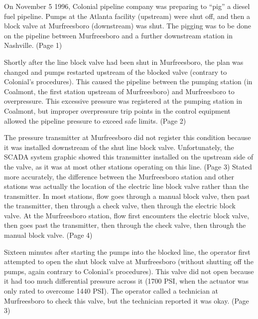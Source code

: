 







On November 5 1996, Colonial pipeline company was preparing to ``pig'' a diesel fuel pipeline.  Pumps at the Atlanta facility (upstream) were shut off, and then a block valve at Murfreesboro (downstream) was shut.  The pigging was to be done on the pipeline between Murfreesboro and a further downstream station in Nashville.  (Page 1)

\vskip 10pt

Shortly after the line block valve had been shut in Murfreesboro, the plan was changed and pumps restarted upstream of the blocked valve (contrary to Colonial's procedures).  This caused the pipeline between the pumping station (in Coalmont, the first station upstream of Murfreesboro) and Murfreesboro to overpressure.  This excessive pressure was registered at the pumping station in Coalmont, but improper overpressure trip points in the control equipment allowed the pipeline pressure to exceed safe limits.  (Page 2)

The pressure transmitter at Murfreesboro did not register this condition because it was installed downstream of the shut line block valve.  Unfortunately, the SCADA system graphic showed this transmitter installed on the upstream side of the valve, as it was at most other stations operating on this line.  (Page 3)  Stated more accurately, the difference between the Murfreesboro station and other stations was actually the location of the electric line block valve rather than the transmitter.  In most stations, flow goes through a manual block valve, then past the transmitter, then through a check valve, then through the electric block valve.  At the Murfreesboro station, flow first encounters the electric block valve, then goes past the transmitter, then through the check valve, then through the manual block valve.  (Page 4)

\vskip 10pt

Sixteen minutes after starting the pumps into the blocked line, the operator first attempted to open the shut block valve at Murfreesboro (without shutting off the pumps, again contrary to Colonial's procedures).  This valve did not open because it had too much differential pressure across it (1700 PSI, when the actuator was only rated to overcome 1440 PSI).  The operator called a technician at Murfreesboro to check this valve, but the technician reported it was okay.  (Page 3)

